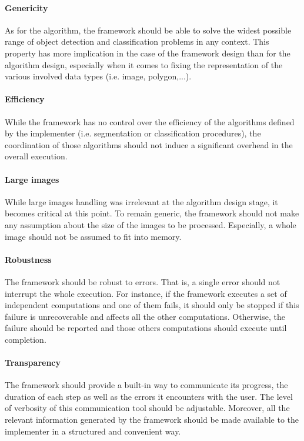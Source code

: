 \paragraph{Genericity} As for the algorithm, the framework should be able to solve the widest possible range of object detection and classification problems in any context. This property has more implication in the case of the framework design than for the algorithm design, especially when it comes to fixing the representation of the various involved data types (i.e. image, polygon,...).

\paragraph{Efficiency} While the framework has no control over the efficiency of the algorithms defined by the implementer (i.e. segmentation or classification procedures), the coordination of those algorithms should not induce a significant overhead in the overall execution. 

\paragraph{Large images} While large images handling was irrelevant at the algorithm design stage, it becomes critical at this point. To remain generic, the framework should not make any assumption about the size of the images to be processed. Especially, a whole image should not be assumed to fit into memory.

\paragraph{Robustness} The framework should be robust to errors. That is, a single error should not interrupt the whole execution. For instance, if the framework executes a set of independent computations and one of them fails, it should only be stopped if this failure is unrecoverable and affects all the other computations. Otherwise, the failure should be reported and those others computations should execute until completion. 

\paragraph{Transparency} The framework should provide a built-in way to communicate its progress, the duration of each step as well as the errors it encounters with the user. The level of verbosity of this communication tool should be adjustable. Moreover, all the relevant information generated by the framework should be made available to the implementer in a structured and convenient way.

